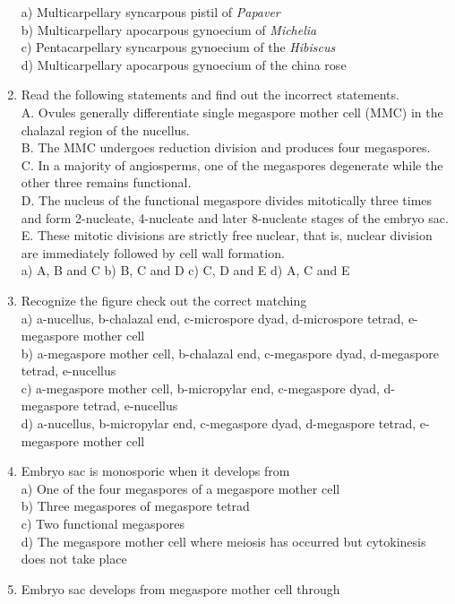 \begin{enumerate}
  a) Multicarpellary syncarpous pistil of \emph{Papaver}\\
  b) Multicarpellary apocarpous gynoecium of \emph{Michelia}\\
  c) Pentacarpellary syncarpous gynoecium of the \emph{Hibiscus}\\
  d) Multicarpellary apocarpous gynoecium of the china rose
\item
  Read the following statements and find out the incorrect statements.\\
  A. Ovules generally differentiate single megaspore mother cell (MMC)
  in the chalazal region of the nucellus.\\
  B. The MMC undergoes reduction division and produces four
  megaspores.\\
  C. In a majority of angiosperms, one of the megaspores degenerate
  while the other three remains functional.\\
  D. The nucleus of the functional megaspore divides mitotically three
  times and form 2-nucleate, 4-nucleate and later 8-nucleate stages of
  the embryo sac.\\
  E. These mitotic divisions are strictly free nuclear, that is, nuclear
  division are immediately followed by cell wall formation.\\
  a) A, B and C b) B, C and D c) C, D and E d) A, C and E
\item
  Recognize the figure check out the correct matching\\
  a) a-nucellus, b-chalazal end, c-microspore dyad, d-microspore tetrad,
  e-megaspore mother cell\\
  b) a-megaspore mother cell, b-chalazal end, c-megaspore dyad,
  d-megaspore tetrad, e-nucellus\\
  c) a-megaspore mother cell, b-micropylar end, c-megaspore dyad,
  d-megaspore tetrad, e-nucellus\\
  d) a-nucellus, b-micropylar end, c-megaspore dyad, d-megaspore tetrad,
  e-megaspore mother cell
\item
  Embryo sac is monosporic when it develops from\\
  a) One of the four megaspores of a megaspore mother cell\\
  b) Three megaspores of megaspore tetrad\\
  c) Two functional megaspores\\
  d) The megaspore mother cell where meiosis has occurred but
  cytokinesis does not take place
\item
  Embryo sac develops from megaspore mother cell through\\

\end{enumerate}
